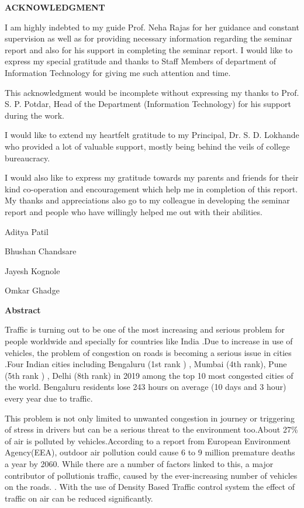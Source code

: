 \documentclass[12pt,a4paper]{report}
\begin{document}
\newpage

\begin{center}
	\textbf{\Large{ACKNOWLEDGMENT}}
\end{center}
I am highly indebted to my guide Prof. Neha Rajas for her guidance and constant supervision as well as for providing necessary information regarding the seminar report and also for his support in completing the seminar report. I would like to express my special gratitude and thanks
to Staff Members of department of Information Technology for giving me such attention and time.\par
This acknowledgment would be incomplete without expressing my thanks to Prof. S. P. Potdar, Head of the Department (Information Technology) for his support during the work.\par
I would like to extend my heartfelt gratitude to my Principal, Dr. S. D. Lokhande who provided a lot of valuable support, mostly being behind the veils of college bureaucracy.\par
I would also like to express my gratitude towards my parents and friends for their kind co-operation and encouragement which help me in completion of this report. My thanks and appreciations also go to my colleague in developing the seminar report and people who have willingly helped me out with their abilities.

\vspace{2cm}
Aditya Patil\par
Bhushan Chandsare\par
Jayesh Kognole\par
Omkar Ghadge\par


\newpage

\begin{center}
	\textbf{\large {Abstract}}
\end{center}


Traffic is turning out to be one of the most increasing and serious problem for people worldwide and specially for countries like India .Due to increase in use of vehicles, the problem of congestion on roads is becoming a serious issue in cities .Four Indian cities including Bengaluru (1st rank )  , Mumbai (4th rank), Pune (5th rank ) ,  Delhi (8th rank) in 2019 among the top 10 most congested cities of the world. Bengaluru residents lose 243 hours on average (10 days and 3 hour) every year due to traffic.\par
This problem is not only limited to unwanted congestion in journey or triggering of stress in drivers but can be a serious threat to the environment too.About 27\% of air is polluted by vehicles.According to a report from European Environment Agency(EEA), outdoor air pollution could cause 6 to 9 million premature deaths a year by 2060. While there are a number of factors linked to this, a major contributor of pollutionis traffic, caused by the ever-increasing number of vehicles on the roads.
. With the use of Density Based Traffic control system the effect of traffic on air can be reduced significantly.\par
\end{document}
